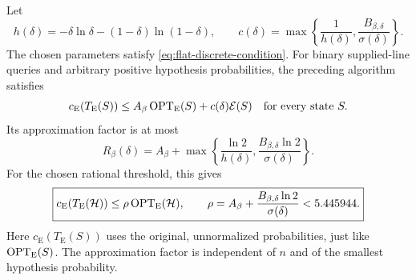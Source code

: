 \begin{theorem}
\label{thm:mass-average}
Let
\[
 h(\delta)=-\delta\ln\delta-(1-\delta)\ln(1-\delta),\qquad
 c(\delta)=\max\left\{\frac1{h(\delta)},
                    \frac{B_{\beta,\delta}}{\sigma(\delta)}\right\}.
\]
The chosen parameters satisfy \eqref{eq:flat-discrete-condition}.
For binary supplied-line queries and arbitrary positive hypothesis
probabilities, the preceding algorithm satisfies
\[
 c_{\mathrm E}(T_{\mathrm E}(S))\le
 A_\beta \operatorname{OPT}_{\mathrm E}(S)+c(\delta)\mathcal E(S)
 \quad\text{for every state }S.
\]
Its approximation factor is at most
\begin{equation}\label{eq:parameter-ratio}
 R_\beta(\delta)=A_\beta+
 \max\left\{\frac{\ln2}{h(\delta)},
            \frac{B_{\beta,\delta}\ln2}{\sigma(\delta)}\right\}.
\end{equation}
For the chosen rational threshold, this gives
\begin{equation}\label{eq:mass-average}
 \boxed{c_{\mathrm E}(T_{\mathrm E}(\mathcal H))
         \le\rho \operatorname{OPT}_{\mathrm E}(\mathcal H),\qquad
 \rho=A_\beta+\frac{B_{\beta,\delta}\ln2}{\sigma(\delta)}<5.445944.}
\end{equation}
Here $c_{\mathrm E}(T_{\mathrm E}(S))$ uses the original,
unnormalized probabilities, just like $\operatorname{OPT}_{\mathrm E}(S)$.
The approximation factor is independent of $n$ and of the smallest
hypothesis probability.
\end{theorem}
